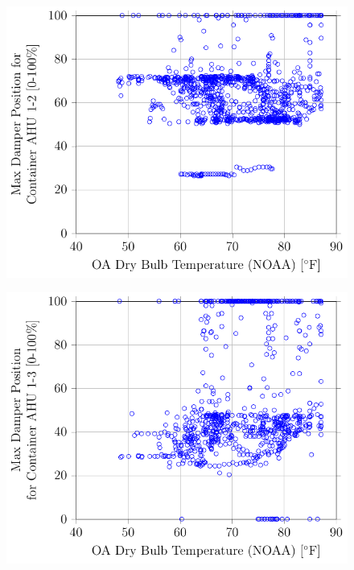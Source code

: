 \begin{figure}
\centering
\includegraphics{Plots/MaximumDamperPosition-1-2.pdf} 
\caption{}
\label{fig:MaxDamperPositionforContainerAHU12vsOADryBulbTemperatureNOAA}
\end{figure}

\begin{figure}
\centering
\includegraphics{Plots/MaximumDamperPosition-1-3.pdf}
\caption{}
\label{fig:MaxDamperPositionforContainerAHU13vsOADryBulbTemperatureNOAA}
\end{figure}


